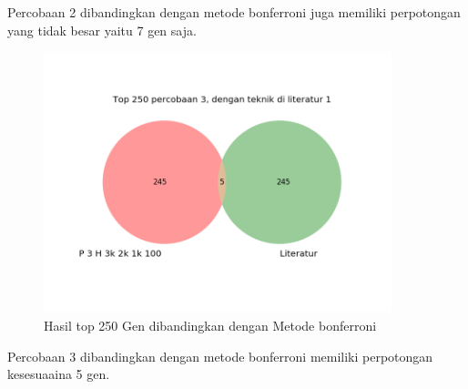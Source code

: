 Percobaan 2 dibandingkan dengan metode bonferroni juga memiliki perpotongan yang tidak besar yaitu 7 gen saja.

\begin{figure}
	\centering
	\includegraphics[width=0.9\textwidth]
		{pics/bon3.png}
	\caption{Hasil top 250 Gen dibandingkan dengan Metode bonferroni}
	\label{fig:bon3}
\end{figure}

Percobaan 3 dibandingkan dengan metode bonferroni memiliki perpotongan kesesuaaina 5 gen.



